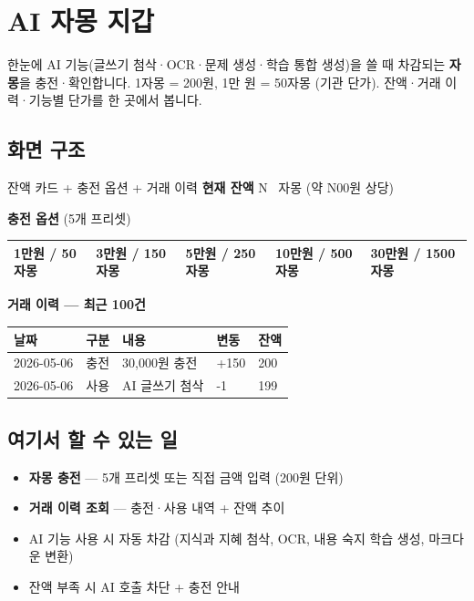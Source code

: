 \chapter{AI 자몽 지갑}

\begin{summarybox}{한눈에}
AI 기능(글쓰기 첨삭·OCR·문제 생성·학습 통합 생성)을 쓸 때 차감되는 \textbf{자몽}을 충전·확인합니다. 1자몽 = 200원, 1만 원 = 50자몽 (기관 단가). 잔액·거래 이력·기능별 단가를 한 곳에서 봅니다.
\end{summarybox}


\section*{화면 구조}

\begin{screenbox}{잔액 카드 + 충전 옵션 + 거래 이력}
\textbf{현재 잔액} \quad N \, 자몽 \quad (약 N00원 상당)

\medskip
\textbf{충전 옵션} (5개 프리셋)
\noindent
\begin{tabular}{@{}p{3cm}p{3cm}p{3cm}p{3cm}p{3cm}@{}}
\toprule
1만원 / 50자몽 & 3만원 / 150자몽 & 5만원 / 250자몽 & 10만원 / 500자몽 & 30만원 / 1500자몽 \\
\bottomrule
\end{tabular}
\medskip

\textbf{거래 이력 — 최근 100건}
\noindent
\begin{tabular}{@{}p{3cm}p{1.5cm}p{4cm}p{1.5cm}p{1.5cm}@{}}
\toprule
\textbf{날짜} & \textbf{구분} & \textbf{내용} & \textbf{변동} & \textbf{잔액} \\
\midrule
2026-05-06 & 충전 & 30,000원 충전 & +150 & 200 \\
2026-05-06 & 사용 & AI 글쓰기 첨삭 & -1 & 199 \\
\bottomrule
\end{tabular}
\end{screenbox}

\section*{여기서 할 수 있는 일}
\begin{itemize}[leftmargin=1.2em]
  \item \textbf{자몽 충전} — 5개 프리셋 또는 직접 금액 입력 (200원 단위)
  \item \textbf{거래 이력 조회} — 충전·사용 내역 + 잔액 추이
  \item AI 기능 사용 시 자동 차감 (지식과 지혜 첨삭, OCR, 내용 숙지 학습 생성, 마크다운 변환)
  \item 잔액 부족 시 AI 호출 차단 + 충전 안내
\end{itemize}

